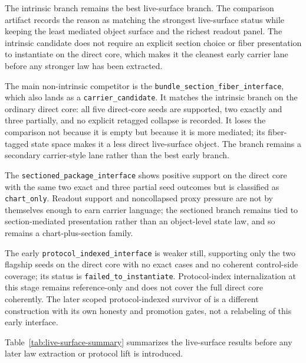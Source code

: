 \documentclass[11pt]{article}
\theoremstyle{definition}
\begin{document}
The intrinsic branch remains the best live-surface branch. The comparison artifact
records the reason as matching the strongest live-surface status while keeping the
least mediated object surface and the richest readout panel. The intrinsic candidate
does not require an explicit section choice or fiber presentation to instantiate on the
direct core, which makes it the cleanest early carrier lane before any stronger law
has been extracted.

The main non-intrinsic competitor is the \texttt{bundle\_section\_fiber\_interface},
which also lands as a \texttt{carrier\_candidate}. It matches the intrinsic branch on
the ordinary direct core: all five direct-core seeds are supported, two exactly and
three partially, and no explicit retagged collapse is recorded. It loses the
comparison not because it is empty but because it is more mediated; its fiber-tagged
state space makes it a less direct live-surface object. The branch remains a secondary
carrier-style lane rather than the best early branch.

The \texttt{sectioned\_package\_interface} shows positive support on the direct core
with the same two exact and three partial seed outcomes but is classified as
\texttt{chart\_only}. Readout support and noncollapsed proxy pressure are not by
themselves enough to earn carrier language; the sectioned branch remains tied to
section-mediated presentation rather than an object-level state law, and so remains a
chart-plus-section family.

The early \texttt{protocol\_indexed\_interface} is weaker still, supporting only the
two flagship seeds on the direct core with no exact cases and no coherent control-side
coverage; its status is \texttt{failed\_to\_instantiate}. Protocol-index internalization
at this stage remains reference-only and does not cover the full direct core
coherently. The later scoped protocol-indexed survivor of
 is a different construction with its own
honesty and promotion gates, not a relabeling of this early interface.

Table~\ref{tab:live-surface-summary} summarizes the live-surface results before any later
law extraction or protocol lift is introduced.
\end{document}
